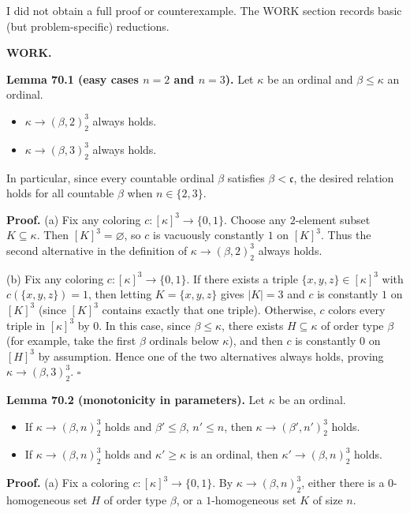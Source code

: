 I did not obtain a full proof or counterexample. The WORK section records basic (but problem-specific) reductions.

\medskip
\noindent\textbf{WORK.}

\medskip
\noindent\textbf{Lemma 70.1 (easy cases $n=2$ and $n=3$).}
Let $\kappa$ be an ordinal and $\beta\le\kappa$ an ordinal.
\begin{itemize}
\item[(a)] $\kappa\to(\beta,2)_2^3$ always holds.
\item[(b)] $\kappa\to(\beta,3)_2^3$ always holds.
\end{itemize}
In particular, since every countable ordinal $\beta$ satisfies $\beta<\mathfrak c$, the desired relation holds for all countable $\beta$ when $n\in\{2,3\}$.

\noindent\textbf{Proof.}
(a) Fix any coloring $c:[\kappa]^3\to\{0,1\}$. Choose any $2$-element subset $K\subseteq\kappa$. Then $[K]^3=\varnothing$, so $c$ is vacuously constantly $1$ on $[K]^3$. Thus the second alternative in the definition of $\kappa\to(\beta,2)_2^3$ always holds.

(b) Fix any coloring $c:[\kappa]^3\to\{0,1\}$. If there exists a triple $\{x,y,z\}\in[\kappa]^3$ with $c(\{x,y,z\})=1$, then letting $K=\{x,y,z\}$ gives $|K|=3$ and $c$ is constantly $1$ on $[K]^3$ (since $[K]^3$ contains exactly that one triple). Otherwise, $c$ colors every triple in $[\kappa]^3$ by $0$. In this case, since $\beta\le\kappa$, there exists $H\subseteq\kappa$ of order type $\beta$ (for example, take the first $\beta$ ordinals below $\kappa$), and then $c$ is constantly $0$ on $[H]^3$ by assumption. Hence one of the two alternatives always holds, proving $\kappa\to(\beta,3)_2^3$.
\hfill$\square$

\medskip
\noindent\textbf{Lemma 70.2 (monotonicity in parameters).}
Let $\kappa$ be an ordinal.
\begin{itemize}
\item[(a)] If $\kappa\to(\beta,n)_2^3$ holds and $\beta'\le\beta$, $n'\le n$, then $\kappa\to(\beta',n')_2^3$ holds.
\item[(b)] If $\kappa\to(\beta,n)_2^3$ holds and $\kappa'\ge \kappa$ is an ordinal, then $\kappa'\to(\beta,n)_2^3$ holds.
\end{itemize}

\noindent\textbf{Proof.}
(a) Fix a coloring $c:[\kappa]^3\to\{0,1\}$. By $\kappa\to(\beta,n)_2^3$, either there is a $0$-homogeneous set $H$ of order type $\beta$, or a $1$-homogeneous set $K$ of size $n$.

